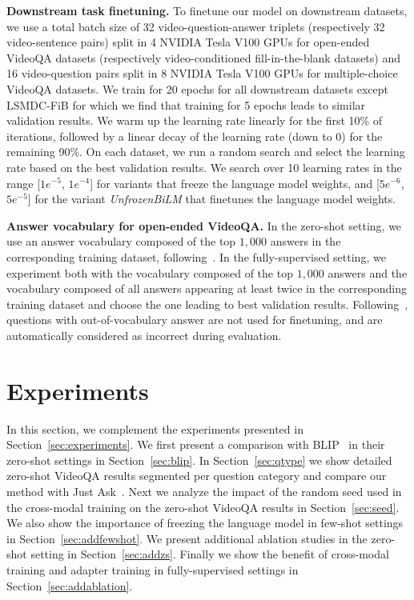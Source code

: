 \noindent \textbf{Downstream task finetuning.}
To finetune our model on downstream datasets, we use a total batch size of 32 video-question-answer triplets (respectively 32 video-sentence pairs) split in 4 NVIDIA Tesla V100 GPUs for open-ended VideoQA datasets (respectively video-conditioned fill-in-the-blank datasets) and 16 video-question pairs split in 8 NVIDIA Tesla V100 GPUs for multiple-choice VideoQA datasets.
We train for 20 epochs for all downstream datasets except LSMDC-FiB for which we find that training for 5 epochs leads to similar validation results.
We warm up the learning rate linearly for the first 10\% of iterations, followed by a linear decay of the learning rate (down to 0) for the remaining 90\%. 
On each dataset, we run a random search and select the learning rate based on the best validation results.
We search over 10 learning rates in the range [$1e^{-5}$, $1e^{-4}$] for variants that freeze the language model weights, and [$5e^{-6}$, $5e^{-5}$] for the variant \textit{UnfrozenBiLM} that finetunes the language model weights.

\noindent \textbf{Answer vocabulary for open-ended VideoQA.}
In the zero-shot setting, we use an answer vocabulary composed of the top $1,000$ answers in the corresponding training dataset, following~\cite{zellers2021merlot}. 
In the fully-supervised setting, we experiment both with the vocabulary composed of the top $1,000$ answers and the vocabulary composed of all answers appearing at least twice in the corresponding training dataset and choose the one leading to best validation results.
Following~\cite{zellers2021merlot}, questions with out-of-vocabulary answer are not used for finetuning, and are automatically considered as incorrect during evaluation.

\section{Experiments}\label{sec:addexperiments}

In this section, we complement the experiments presented in Section~\ref{sec:experiments}.
We first present a comparison with BLIP~\cite{li2022blip} in their zero-shot settings in Section~\ref{sec:blip}.
In Section~\ref{sec:qtype} we show detailed zero-shot VideoQA results segmented per question category and compare our method with Just Ask~\cite{yang2021just}.
Next we analyze the impact of the random seed used in the cross-modal training on the zero-shot VideoQA results in Section~\ref{sec:seed}.
We also show the importance of freezing the language model in few-shot settings in Section~\ref{sec:addfewshot}.
We present additional ablation studies in the zero-shot setting in Section~\ref{sec:addzs}.
Finally we show the benefit of cross-modal training and adapter training in fully-supervised settings in Section~\ref{sec:addablation}.


